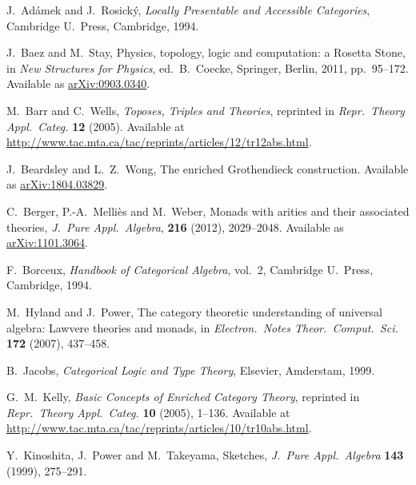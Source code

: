 \documentclass{amsart}
\theoremstyle{definition}
\begin{document}
\begin{thebibliography}{100}

 J.\ Ad\'{a}mek and J.\ Rosick\'{y}, \textsl{Locally Presentable and Accessible Categories}, Cambridge U.\ Press, Cambridge, 1994.

 J.\ Baez and M.\ Stay, Physics, topology, logic and computation: a Rosetta Stone, in \textsl{New Structures for Physics}, ed.\ B.\ Coecke, Springer, Berlin, 2011, pp.\ 95--172.  Available as \href{https://arxiv.org/abs/0903.0340}{arXiv:0903.0340}.
	
 M.\ Barr and C.\ Wells, \textsl{Toposes, Triples and Theories}, reprinted in \textsl{Repr.\ Theory Appl.\ Categ.} \textbf{12} (2005).   Available at \href{http://www.tac.mta.ca/tac/reprints/articles/12/tr12abs.html}{http://www.tac.mta.ca/tac/reprints/articles/12/tr12abs.html}.

 J.\ Beardsley and L.\ Z.\ Wong, The enriched Grothendieck construction.  Available as \href{https://arxiv.org/abs/1804.03829}{arXiv:1804.03829}.
	
 C.\ Berger, P.-A.\ Melli\`es and M.\ Weber, Monads with arities and their associated theories, \textsl{J.\ Pure Appl.\ Algebra}, \textbf{216} (2012), 2029--2048.  Available as \href{https://arxiv.org/abs/1101.3064}{arXiv:1101.3064}.

 F.\ Borceux, \textsl{Handbook of Categorical Algebra}, vol.\ 2, Cambridge U.\ Press, Cambridge, 1994.


 M.\ Hyland and J.\ Power, The category theoretic understanding of 
universal algebra: Lawvere theories and monads, in \textsl{Electron.\ Notes Theor.\ Comput.\ 
Sci.} \textbf{172} (2007), 437--458.

 B.\ Jacobs, \textsl{Categorical Logic and Type Theory}, Elsevier, Amderstam, 1999.
	
 G.\ M.\ Kelly, \textsl{Basic Concepts of Enriched Category Theory}, reprinted in
\textsl{Repr.\ Theory Appl.\ Categ.} \textbf{10} (2005), 1--136.  Available at \href{http://www.tac.mta.ca/tac/reprints/articles/10/tr10abs.html}{http://www.tac.mta.ca/tac/reprints/articles/10/tr10abs.html}.

 Y.\ Kinoshita, J.\ Power and M.\ Takeyama, Sketches,
\textsl{J.\ Pure Appl.\ Algebra} \textbf{143} (1999), 275--291.


\end{thebibliography}
\end{document}
